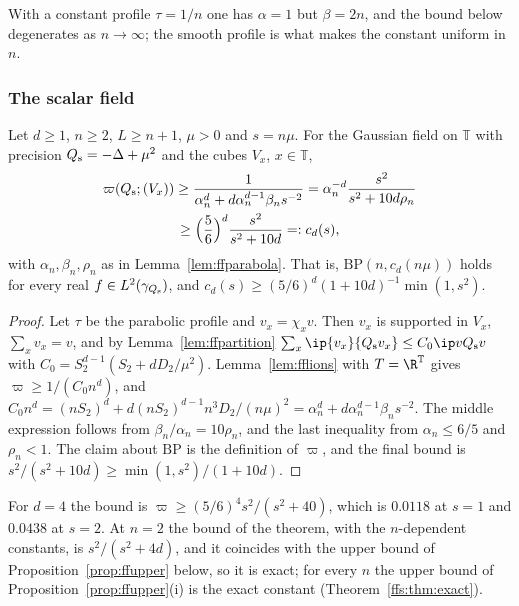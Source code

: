 With a constant profile $\tau=1/n$ one has $\alpha=1$ but $\beta=2n$, and the
bound below degenerates as $n\to\infty$; the smooth profile is what makes the
constant uniform in $n$.

\subsubsection{The scalar field}

\begin{theorem}\label{thm:ffscalar}
Let $d\ge1$, $n\ge2$, $L\ge n+1$, $\mu>0$ and $s=n\mu$. For the Gaussian
field on $\mathbb T$ with precision $Q_{\rm s}=-\Delta+\mu^2$ and the cubes
$V_x$, $x\in\mathbb T$,
\begin{multline*}
\varpi(Q_{\rm s};(V_x))\ge\frac1{\alpha_n^d+d\alpha_n^{d-1}\beta_ns^{-2}}
=\alpha_n^{-d}\frac{s^2}{s^2+10d\rho_n}\\
\ge\Bigl(\frac56\Bigr)^d\frac{s^2}{s^2+10d}=:c_d(s),
\end{multline*}
with $\alpha_n,\beta_n,\rho_n$ as in Lemma~\ref{lem:ffparabola}. That is,
$\mathrm{BP}(n,c_d(n\mu))$ holds for every real $f\in L^2(\gamma_{Q_{\rm
s}})$, and $c_d(s)\ge(5/6)^d(1+10d)^{-1}\min(1,s^2)$.
\end{theorem}

\begin{proof}
Let $\tau$ be the parabolic profile and $v_x=\chi_xv$. Then $v_x$ is
supported in $V_x$, $\sum_xv_x=v$, and by Lemma~\ref{lem:ffpartition}
$\sum_x\ip{v_x}{Q_{\rm s}v_x}\le C_0\ip v{Q_{\rm s}v}$ with $C_0=S_2^{d-1}
(S_2+dD_2/\mu^2)$. Lemma~\ref{lem:fflions} with $T=\R^{\mathbb T}$ gives
$\varpi\ge1/(C_0n^d)$, and $C_0n^d=(nS_2)^d+d(nS_2)^{d-1}n^3D_2/(n\mu)^2=
\alpha_n^d+d\alpha_n^{d-1}\beta_ns^{-2}$. The middle expression follows from
$\beta_n/\alpha_n=10\rho_n$, and the last inequality from $\alpha_n\le6/5$
and $\rho_n<1$. The claim about $\mathrm{BP}$ is the definition of
$\varpi$, and the final bound is $s^2/(s^2+10d)\ge\min(1,s^2)/(1+10d)$.
\end{proof}

For $d=4$ the bound is $\varpi\ge(5/6)^4s^2/(s^2+40)$, which is $0.0118$ at
$s=1$ and $0.0438$ at $s=2$. At $n=2$ the bound of the theorem, with the $n$-dependent constants, is
$s^2/(s^2+4d)$, and it coincides with the upper bound of
Proposition~\ref{prop:ffupper} below, so it is exact; for every $n$ the upper
bound of Proposition~\ref{prop:ffupper}(i) is the exact constant
(Theorem~\ref{ffs:thm:exact}).

